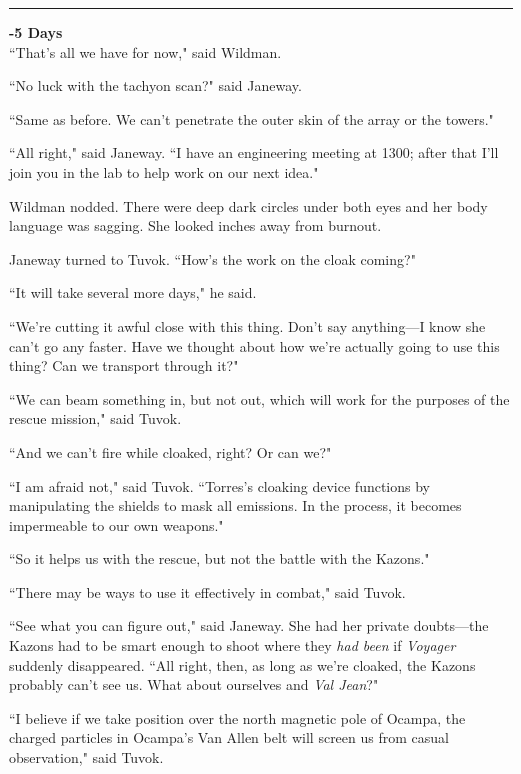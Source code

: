 \documentclass[twoside,letterpaper,12pt]{memoir}
\begin{document}
\begin{center}\rule{3cm}{0.4 pt}\end{center} 

\noindent\textbf{-5 Days} \\

``That's all we have for now," said Wildman. 

``No luck with the tachyon scan?" said Janeway. 

``Same as before. We can't penetrate the outer skin of the array or the towers." 

``All right," said Janeway. ``I have an engineering meeting at 1300; after that I'll join you in the lab to help work on our next idea." 

Wildman nodded. There were deep dark circles under both eyes and her body language was sagging. She looked inches away from burnout. 

Janeway turned to Tuvok. ``How's the work on the cloak coming?" 

``It will take several more days," he said. 

``We're cutting it awful close with this thing. Don't say anything---I know she can't go any faster. Have we thought about how we're actually going to use this thing? Can we transport through it?" 

``We can beam something in, but not out, which will work for the purposes of the rescue mission," said Tuvok. 

``And we can't fire while cloaked, right? Or can we?" 

``I am afraid not," said Tuvok. ``Torres's cloaking device functions by manipulating the shields to mask all emissions. In the process, it becomes impermeable to our own weapons." 

``So it helps us with the rescue, but not the battle with the Kazons." 

``There may be ways to use it effectively in combat," said Tuvok. 

``See what you can figure out," said Janeway. She had her private doubts---the Kazons had to be smart enough to shoot where they \textit{had been} if \textit{Voyager} suddenly disappeared. ``All right, then, as long as we're cloaked, the Kazons probably can't see us. What about ourselves and \textit{Val Jean}?" 

``I believe if we take position over the north magnetic pole of Ocampa, the charged particles in Ocampa's Van Allen belt will screen us from casual observation," said Tuvok. 
\end{document}
